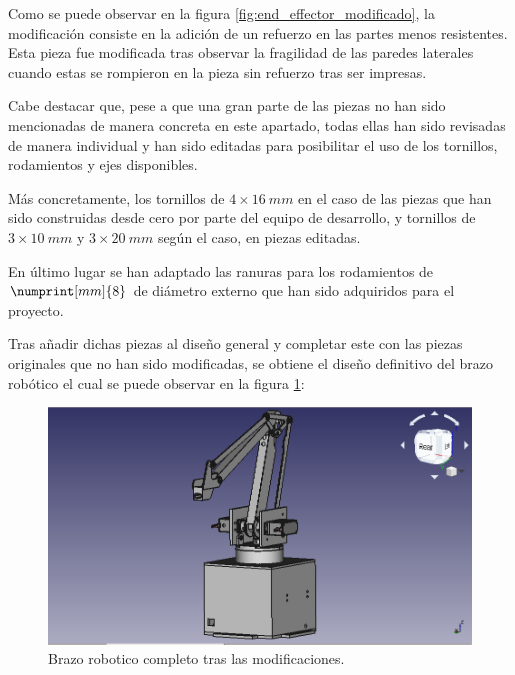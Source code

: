 Como se puede observar en la figura \ref{fig:end_effector_modificado}, la modificación consiste en la adición de un refuerzo en las partes menos resistentes. 
Esta pieza fue modificada tras observar la fragilidad de las paredes laterales cuando estas se rompieron en la pieza sin refuerzo tras ser impresas.

Cabe destacar que, pese a que una gran parte de las piezas no han sido mencionadas de manera concreta en este apartado, todas ellas han sido revisadas de manera individual y han sido editadas para posibilitar el uso de los tornillos, rodamientos y ejes disponibles.

Más concretamente, los tornillos de $4 \times 16~mm$ en el caso de las piezas que han sido construidas desde cero por parte del equipo de desarrollo, y tornillos de $3 \times 10~mm$ y $3 \times 20~mm$ según el caso, en piezas editadas.

En último lugar se han adaptado las ranuras para los rodamientos de $\numprint[mm]{8}$ de diámetro externo que han sido adquiridos para el proyecto.

Tras añadir dichas piezas al diseño general y completar este con las piezas originales que no han sido modificadas, se obtiene el diseño definitivo del brazo robótico el cual se puede observar en la figura \ref{fig:brazo_completo_modificado}:

\begin{figure}[H]
    \centering
    \includegraphics[width=.9\linewidth]{pictures/BrazoEntero.png}
    \caption{Brazo robotico completo tras las modificaciones.}
    \label{fig:brazo_completo_modificado}
\end{figure}